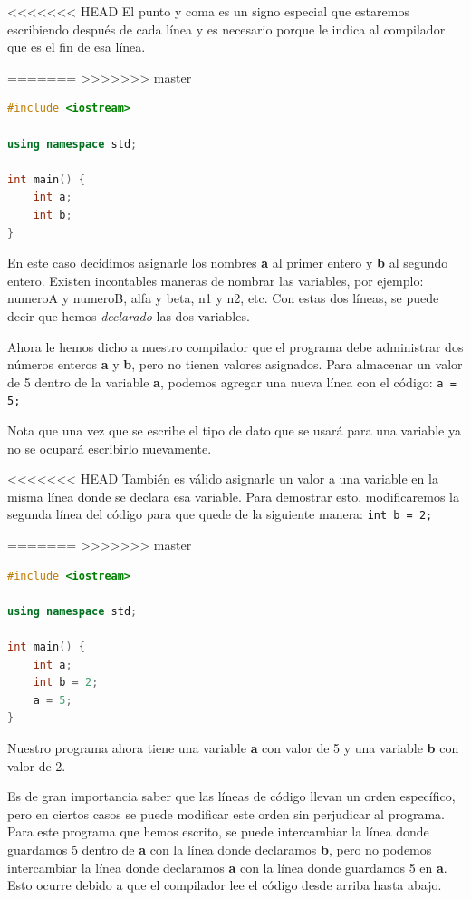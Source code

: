 \documentclass{article}
\begin{document}
<<<<<<< HEAD
El punto y coma es un signo especial que estaremos escribiendo después de cada línea y es necesario porque le indica al compilador que es el fin de esa línea.

=======
>>>>>>> master
\begin{lstlisting}[language=C++, title=Dos variables]
#include <iostream>

using namespace std;

int main() {
	int a;
	int b;
}
\end{lstlisting}

En este caso decidimos asignarle los nombres \textbf{a} al primer entero y \textbf{b} al segundo entero. Existen incontables maneras de nombrar las variables, por ejemplo: numeroA y numeroB, alfa y beta, n1 y n2, etc. Con estas dos líneas, se puede decir que hemos \textit{declarado} las dos variables.

Ahora le hemos dicho a nuestro compilador que el programa debe administrar dos números enteros \textbf{a} y \textbf{b}, pero no tienen valores asignados. Para almacenar un valor de 5 dentro de la variable \textbf{a}, podemos agregar una nueva línea con el código: \lstinline{a = 5;}

Nota que una vez que se escribe el tipo de dato que se usará para una variable ya no se ocupará escribirlo nuevamente.

<<<<<<< HEAD
También es válido asignarle un valor a una variable en la misma línea donde se declara esa variable. Para demostrar esto, modificaremos la segunda línea del código para que quede de la siguiente manera: \lstinline{int b = 2;}

=======
>>>>>>> master
\begin{lstlisting}[language=C++, title=Guardando valores]
#include <iostream>

using namespace std;

int main() {
	int a;
	int b = 2;
	a = 5;
}
\end{lstlisting}

Nuestro programa ahora tiene una variable \textbf{a} con valor de 5 y una variable \textbf{b} con valor de 2.

Es de gran importancia saber que las líneas de código llevan un orden específico, pero en ciertos casos se puede modificar este orden sin perjudicar al programa. Para este programa que hemos escrito, se puede intercambiar la línea donde guardamos 5 dentro de \textbf{a} con la línea donde declaramos \textbf{b}, pero no podemos intercambiar la línea donde declaramos \textbf{a} con la línea donde guardamos 5 en \textbf{a}. Esto ocurre debido a que el compilador lee el código desde arriba hasta abajo.
\end{document}
